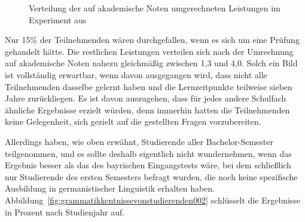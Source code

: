 \begin{figure}[htpb]
  \centering
  \caption{Verteilung der auf akademische Noten umgerechneten Leistungen im Experiment aus \citet{SchaeferSayatz2017a}}
  \label{fig:grammatikkentnissevonstudierenden001}
\end{figure}

Nur 15\% der Teilnehmenden wären durchgefallen, wenn es sich um eine Prüfung gehandelt hätte.
Die restlichen Leistungen verteilen sich nach der Umrechnung auf akademische Noten nahezu gleichmäßig zwischen 1,3 und 4,0.
Solch ein Bild ist vollständig erwartbar, wenn davon ausgegangen wird, dass nicht alle Teilnehmenden dasselbe gelernt haben und die Lernzeitpunkte teilweise sieben Jahre zurückliegen.
Es ist davon auszugehen, dass für jedes andere Schulfach ähnliche Ergebnisse erzielt würden, denn immerhin hatten die Teilnehmenden keine Gelegenheit, sich gezielt auf die gestellten Fragen vorzubereiten.

Allerdings haben, wie oben erwähnt, Studierende aller Bachelor-Semester teilgenommen, und es sollte deshalb eigentlich nicht wundernehmen, wenn das Ergebnis besser als das des bayrischen Eingangstests wäre, bei dem schließlich nur Studierende des ersten Semesters befragt wurden, die noch keine spezifische Ausbildung in germanistischer Linguistik erhalten haben.
Abbildung~\ref{fig:grammatikkentnissevonstudierenden002} schlüsselt die Ergebnisse in Prozent nach Studienjahr auf.


